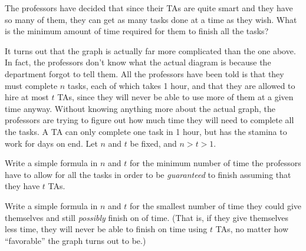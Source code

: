 \documentclass[12pt,twoside]{article}
\begin{document}
\begin{problem}{20}
 The professors have decided that since their TAs are quite
smart and they have so many of them, they can get as many tasks done at a time as
they wish.  What is the minimum amount of time required for them to
finish all the tasks?


\eparts

It turns out that the graph is actually far more complicated than the
one above.  In fact, the professors don't know what the actual diagram is because the department forgot to tell them.  All the professors have been told is that they must
complete $n$ tasks, each of which takes 1 hour, and that they are allowed to hire at most $t$ TAs, since they will never be able to use more of them at a given time anyway.  Without knowing
anything more about the actual graph, the professors are trying to figure out how
much time they will need to complete all the tasks.  A TA can only complete one task in 1
hour, but has the stamina to work for days on end.  Let $n$ and $t$ be
fixed, and $n>t>1$.

\bparts
{} Write a simple formula in $n$ and $t$ for the minimum number of time the professors have to allow for all the tasks in order to be \emph{guaranteed}
to finish assuming that they have $t$ TAs.


 Write a simple formula in $n$ and $t$ for the smallest
number of time they could give themselves and still \emph{possibly} finish on of time.  (That is, if they give themselves less time, they will
never be able to finish on time using $t$ TAs, no matter
how ``favorable'' the graph turns out to be.)

\eparts
\end{problem}
\end{document}
